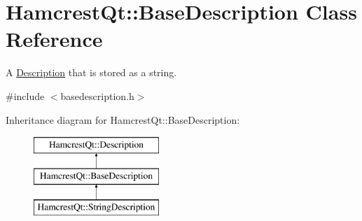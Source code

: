 \hypertarget{class_hamcrest_qt_1_1_base_description}{\section{Hamcrest\-Qt\-:\-:Base\-Description Class Reference}
\label{class_hamcrest_qt_1_1_base_description}
}


A \hyperlink{class_hamcrest_qt_1_1_description}{Description} that is stored as a string.  




{\ttfamily \#include $<$basedescription.\-h$>$}

Inheritance diagram for Hamcrest\-Qt\-:\-:Base\-Description\-:\begin{figure}[H]
\begin{center}
\leavevmode
\includegraphics[height=3.000000cm]{class_hamcrest_qt_1_1_base_description}
\end{center}
\end{figure}
